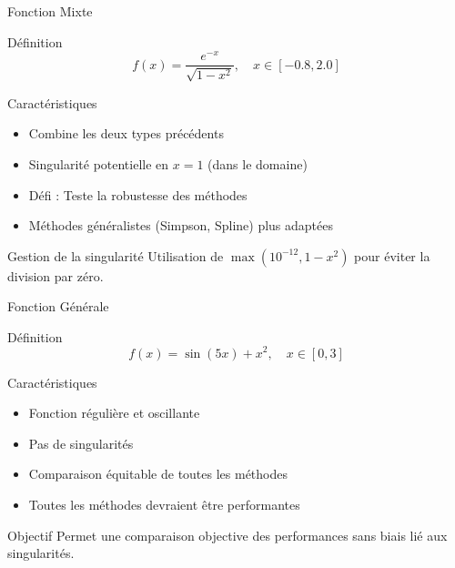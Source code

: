 \documentclass[aspectratio=169,11pt]{beamer}
\begin{document}
\begin{frame}{Fonction Mixte}
\vspace{-0.2cm}
\begin{block}{Définition}
\small
\begin{equation}
f(x) = \frac{e^{-x}}{\sqrt{1-x^2}}, \quad x \in [-0.8, 2.0]
\end{equation}
\end{block}

\vspace{-0.15cm}
\begin{block}{Caractéristiques}
\small
\begin{itemize}
\item Combine les deux types précédents
\item Singularité potentielle en $x=1$ (dans le domaine)
\item Défi : Teste la robustesse des méthodes
\item Méthodes généralistes (Simpson, Spline) plus adaptées
\end{itemize}
\end{block}

\vspace{-0.15cm}
\begin{block}{Gestion de la singularité}
\small Utilisation de $\max(10^{-12}, 1-x^2)$ pour éviter la division par zéro.
\end{block}
\end{frame}

\begin{frame}{Fonction Générale}
\vspace{-0.2cm}
\begin{block}{Définition}
\small
\begin{equation}
f(x) = \sin(5x) + x^2, \quad x \in [0, 3]
\end{equation}
\end{block}

\vspace{-0.15cm}
\begin{block}{Caractéristiques}
\small
\begin{itemize}
\item Fonction régulière et oscillante
\item Pas de singularités
\item Comparaison équitable de toutes les méthodes
\item Toutes les méthodes devraient être performantes
\end{itemize}
\end{block}

\vspace{-0.15cm}
\begin{block}{Objectif}
\small Permet une comparaison objective des performances sans biais lié aux singularités.
\end{block}
\end{frame}
\end{document}
